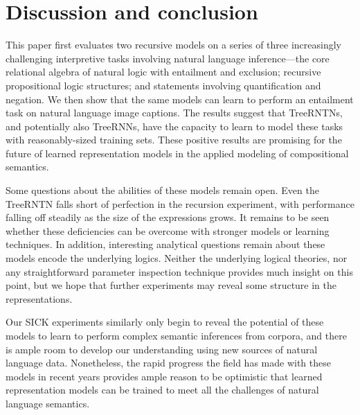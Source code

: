 \section{Discussion and conclusion}\label{sec:discussion}

This paper first evaluates two recursive models on a series of three increasingly
challenging interpretive tasks involving natural language inference---the 
core relational algebra of natural logic with entailment and
exclusion; recursive propositional logic structures; and statements
involving quantification and negation. We then show that the same models can learn to
perform an entailment task on natural language image captions. The results suggest that TreeRNTNs,
and potentially also TreeRNNs, have the capacity to learn to model these tasks with 
reasonably-sized training sets. These positive results are
promising for the future of learned representation models in the
applied modeling of compositional semantics.

Some questions about the abilities of these models remain open. Even
the TreeRNTN falls short of perfection in the recursion experiment, with
performance falling off steadily as the size of the expressions grows. It
remains to be seen whether these deficiencies can be overcome with
stronger models or learning techniques. In addition, interesting 
analytical questions remain about  these models encode
the underlying logics. Neither the underlying
logical theories, nor any straightforward parameter inspection technique provides 
much insight on this point, but we hope that further experiments may reveal 
some structure in the representations.

Our SICK experiments similarly only begin to reveal the potential of these models to learn to 
perform complex semantic inferences from corpora, and there is ample room to develop our understanding
using new sources of natural language data. Nonetheless, the rapid progress the field 
has made with these models in recent years provides ample reason to be optimistic that 
learned representation models can be trained to
meet all the challenges of natural language semantics.

